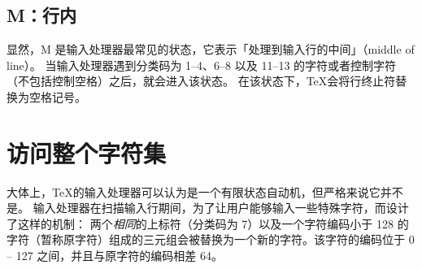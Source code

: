 \documentclass{book}
\begin{document}
\subsection{\cstate M：行内}

显然，\cstate M 是输入处理器最常见的状态，它表示「处理到输入行的中间」（middle of line）。
当输入处理器遇到分类码为 1--4、6--8 以及 11--13 的字符或者控制字符（不包括控制空格）之后，就会进入该状态。
在该状态下，\TeX 会将行终止符替换为空格记号。

%

\begin{quotation}
  \figmouth
\end{quotation}

\section{访问整个字符集}
\label{hathat}

大体上，\TeX 的输入处理器可以认为是一个有限状态自动机，但严格来说它并不是。
输入处理器在扫描输入行期间，为了让用户能够输入一些特殊字符，而设计了这样的机制：
两个{\slshape 相同}的上标符（分类码为 7）以及一个字符编码小于 128 的字符（暂称原字符）组成的三元组会被替换为一个新的字符。该字符的编码位于 0 -- 127 之间，并且与原字符的编码相差 64。
\end{document}

